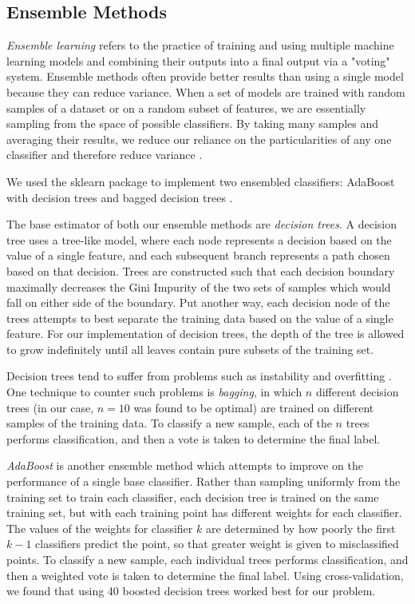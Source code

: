 \documentclass[conference]{IEEEtran}
\begin{document}
\subsection{Ensemble Methods}\label{AA}
\textit{Ensemble learning} refers to the practice of training and using multiple machine learning models and combining their outputs into a final output via a "voting" system. Ensemble methods often provide better results than using a single model because they can reduce variance. When a set of models are trained with random samples of a dataset or on a random subset of features, we are essentially sampling from the space of possible classifiers. By taking many samples and averaging their results, we reduce our reliance on the particularities of any one classifier and therefore reduce variance \cite{Dietterich}.

We used the sklearn package \cite{Pedregosa} to implement two ensembled classifiers: AdaBoost with decision trees \cite{Zhu} and bagged decision trees \cite{Breiman}. 

The base estimator of both our ensemble methods are \textit{decision trees}. A decision tree uses a tree-like model, where each node represents a decision based on the value of a single feature, and each subsequent branch represents a path chosen based on that decision. Trees are constructed such that each decision boundary maximally decreases the Gini Impurity of the two sets of samples which would fall on either side of the boundary. Put another way, each decision node of the trees attempts to best separate the training data based on the value of a single feature. For our implementation of decision trees, the depth of the tree is allowed to grow indefinitely until all leaves contain pure subsets of the training set. 

Decision trees tend to suffer from problems such as instability and overfitting \cite{Gareth}. One technique to counter such problems is \textit{bagging}, in which $n$ different decision trees (in our case, $n = 10$ was found to be optimal) are trained on different samples of the training data. To classify a new sample, each of the $n$ trees performs classification, and then a vote is taken to determine the final label.

\textit{AdaBoost} is another ensemble method which attempts to improve on the performance of a single base classifier. Rather than sampling uniformly from the training set to train each classifier, each decision tree is trained on the same training set, but with each training point has different weights for each classifier. The values of the weights for classifier $k$ are determined by how poorly the first $k-1$ classifiers predict the point, so that greater weight is given to misclassified points. To classify a new sample, each individual trees performs classification, and then a weighted vote is taken to determine the final label. Using cross-validation, we found that using 40 boosted decision trees worked best for our problem.
\end{document}
